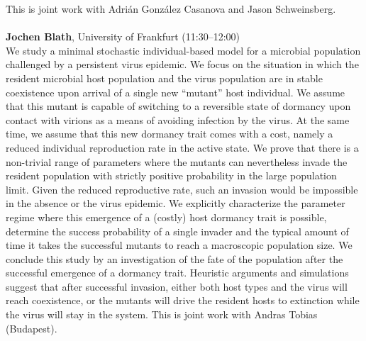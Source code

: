 \documentclass[12pt,a4paper]{article}
\begin{document}
 This is joint work with Adrián González Casanova and Jason Schweinsberg. \\
\\[1ex]{ \large \textbf{ Jochen Blath}}, University of Frankfurt (11:30--12:00) \\[2ex] We study a minimal stochastic individual-based model for a microbial population challenged by a persistent virus epidemic. We focus on the situation in which the resident microbial host population and the virus population are in stable coexistence upon arrival of a single new “mutant” host individual. We assume that this mutant is capable of switching to a reversible state of dormancy upon contact with virions as a means of avoiding infection by the virus. At the same time, we assume that this new dormancy trait comes with a cost, namely a reduced individual reproduction rate in the active state. We prove that there is a non-trivial range of parameters where the mutants can nevertheless invade the resident population with strictly positive probability in the large population limit.  Given the reduced reproductive rate, such an invasion would be impossible in the absence or the virus epidemic. We explicitly characterize the parameter regime where this emergence of a (costly) host dormancy trait is possible, determine the success probability of a single invader and the typical amount of time it takes the successful mutants to reach a macroscopic population size. We conclude this study by an investigation of the fate of the population after the successful emergence of a dormancy trait. Heuristic arguments and simulations suggest that after successful invasion, either both host types and the virus will reach coexistence, or the mutants will drive the resident hosts to extinction while the virus will stay in the system. This is joint work with Andras Tobias (Budapest). \\
\bigskip\bigskip
\end{document}
